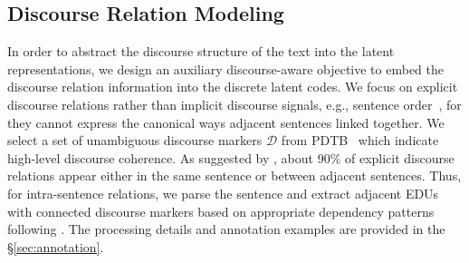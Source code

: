 \documentclass[11pt]{article}
\begin{document}

\subsection{Discourse Relation Modeling}\label{sec:disc}

In order to abstract the discourse structure of the text into the latent representations, we design an auxiliary discourse-aware objective to embed the discourse relation information into the discrete latent codes. We focus on explicit discourse relations rather than implicit discourse signals, e.g., sentence order~\citep{DBLP:conf/naacl/BosselutCHGHC18}, for they cannot express the canonical ways adjacent sentences linked together. %
We select a set of unambiguous discourse markers $\mathcal{D}$ 
from PDTB~\citep{pdtb2} which indicate high-level discourse coherence. As suggested by \citet{pdtb2}, about 90\% of explicit discourse relations appear either in the same sentence or between adjacent sentences.
Thus, for intra-sentence relations, we parse the sentence and extract adjacent EDUs with connected discourse markers based on appropriate dependency patterns following \citet{DisSent}.
The processing details and annotation examples are provided in the \S{\ref{sec:annotation}}.
\end{document}
